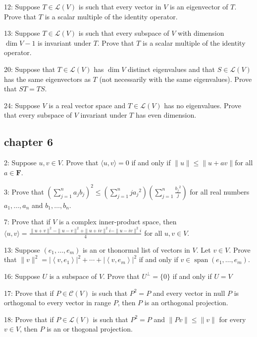 \documentclass{article}
\begin{document}
12: Suppose $T \in \mathcal{L}(V)$ is such that every vector in $V$ is an eigenvector of $T$. Prove that $T$ is a scalar multiple of the identity operator.

13: Suppose $T \in \mathcal{L}(V)$ is such that every subspace of $V$ with dimension $\operatorname{dim} V-1$ is invariant under $T$. Prove that $T$ is a scalar multiple of the identity operator.

20: Suppose that $T \in \mathcal{L}(V)$ has $\operatorname{dim} V$ distinct eigenvalues and that $S \in \mathcal{L}(V)$ has the same eigenvectors as $T$ (not necessarily with the same eigenvalues). Prove that $S T=T S$.

24: Suppose $V$ is a real vector space and $T \in \mathcal{L}(V)$ has no eigenvalues. Prove that every subspace of $V$ invariant under $T$ has even dimension.

\subsection*{chapter 6}
2: Suppose $u, v \in V$. Prove that $\langle u, v\rangle=0$ if and only if $\|u\| \leq\|u+a v\|$for all $a \in \mathbf{F}$.

3: Prove that $\left(\sum_{j=1}^{n} a_{j} b_{j}\right)^{2} \leq\left(\sum_{j=1}^{n} j a_{j}{ }^{2}\right)\left(\sum_{j=1}^{n} \frac{b_{j}{ }^{2}}{j}\right)$ for all real numbers $a_{1}, \ldots, a_{n}$ and $b_{1}, \ldots, b_{n}$.

7: Prove that if $V$ is a complex inner-product space, then $\langle u, v\rangle=\frac{\|u+v\|^{2}-\|u-v\|^{2}+\|u+i v\|^{2} i-\|u-i v\|^{2} i}{4}$ for all $u, v \in V$.

13: Suppose $\left(e_{1}, \ldots, e_{m}\right)$ is an or thonormal list of vectors in $V$. Let $v \in V$. Prove that $\|v\|^{2}=\left|\left\langle v, e_{1}\right\rangle\right|^{2}+\cdots+\left|\left\langle v, e_{m}\right\rangle\right|^{2}$ if and only if $v \in \operatorname{span}\left(e_{1}, \ldots, e_{m}\right)$.

16: Suppose $U$ is a subspace of $V$. Prove that $U^{\perp}=\{0\}$ if and only if $U=V$

17: Prove that if $P \in \mathcal{C}(V)$ is such that $P^{2}=P$ and every vector in null $P$ is orthogonal to every vector in range $P$, then $P$ is an orthogonal projection.

18: Prove that if $P \in \mathcal{L}(V)$ is such that $P^{2}=P$ and $\|P v\| \leq\|v\|$ for every $v \in V$, then $P$ is an or thogonal projection.
\end{document}
